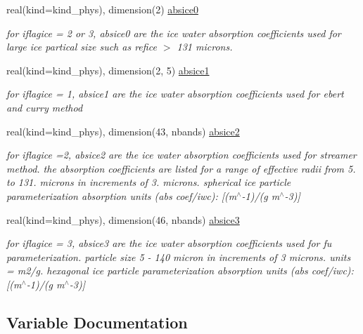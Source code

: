 \begin{DoxyCompactItemize}
real(kind=kind\+\_\+phys), dimension(2) \hyperlink{group__module__radlw__main_ga6610d37cab9ccd4de89237c5de536cfb}{absice0}
\begin{DoxyCompactList}\small\item\em for iflagice = 2 or 3, absice0 are the ice water absorption coefficients used for large ice partical size such as refice $>$ 131 microns. \end{DoxyCompactList}\item 
real(kind=kind\+\_\+phys), dimension(2, 5) \hyperlink{group__module__radlw__main_ga3b86ff9d6791d95170d3b3ab61cd8291}{absice1}
\begin{DoxyCompactList}\small\item\em for iflagice = 1, absice1 are the ice water absorption coefficients used for ebert and curry method \end{DoxyCompactList}\item 
real(kind=kind\+\_\+phys), dimension(43, nbands) \hyperlink{group__module__radlw__main_gad2238686c0e6d1c5d74bcfdde1542e1d}{absice2}
\begin{DoxyCompactList}\small\item\em for iflagice =2, absice2 are the ice water absorption coefficients used for streamer method. the absorption coefficients are listed for a range of effective radii from 5. to 131. microns in increments of 3. microns. spherical ice particle parameterization absorption units (abs coef/iwc)\+: \mbox{[}(m$^\wedge$-\/1)/(g m$^\wedge$-\/3)\mbox{]} \end{DoxyCompactList}\item 
real(kind=kind\+\_\+phys), dimension(46, nbands) \hyperlink{group__module__radlw__main_ga3aa04541d0b809367f88ef8aa0eafdbb}{absice3}
\begin{DoxyCompactList}\small\item\em for iflagice = 3, absice3 are the ice water absorption coefficients used for fu parameterization. particle size 5 -\/ 140 micron in increments of 3 microns. units = m2/g. hexagonal ice particle parameterization absorption units (abs coef/iwc)\+: \mbox{[}(m$^\wedge$-\/1)/(g m$^\wedge$-\/3)\mbox{]} \end{DoxyCompactList}\end{DoxyCompactItemize}


\subsection{Variable Documentation}

